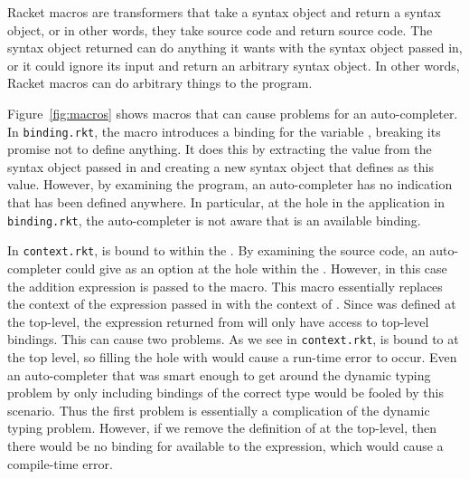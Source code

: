 \documentclass[ms,electronic,twosidetoc,letterpaper,chaptercenter,parttop,lol,lof,lot]{byumsphd}
\begin{document}
Racket macros are transformers that take a syntax object and return a syntax object, or in other words, they take source code and return source code.
The syntax object returned can do anything it wants with the syntax object passed in, or it could ignore its input and return an arbitrary syntax object.
In other words, Racket macros can do arbitrary things to the program.

Figure~\ref{fig:macros} shows macros that can cause problems for an auto-completer.
In \texttt{binding.rkt}, the  macro introduces a binding for the variable , breaking its promise not to define anything.
It does this by extracting the value from the syntax object passed in and creating a new syntax object that defines  as this value.
However, by examining the program, an auto-completer has no indication that  has been defined anywhere.
In particular, at the hole in the \scheme{+} application in \texttt{binding.rkt}, the auto-completer is not aware that  is an available binding.

In \texttt{context.rkt},  is bound to  within the .
By examining the source code, an auto-completer could give  as an option at the hole within the .
However, in this case the addition expression is passed to the  macro.
This macro essentially replaces the context of the expression passed in with the context of .
Since  was defined at the top-level, the expression returned from  will only have access to top-level bindings.
This can cause two problems.
As we see in \texttt{context.rkt},  is bound to  at the top level, so filling the hole with  would cause a run-time error to occur.
Even an auto-completer that was smart enough to get around the dynamic typing problem by only including bindings of the correct type would be fooled by this scenario.
Thus the first problem is essentially a complication of the dynamic typing problem.
However, if we remove the definition of  at the top-level, then there would be no binding for  available to the expression, which would cause a compile-time error.
\end{document}
